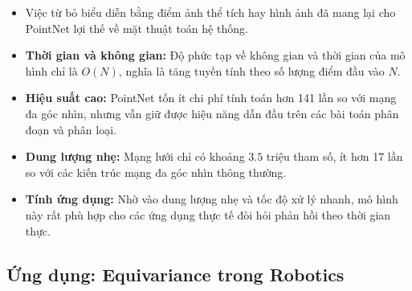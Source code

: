 \begin{itemize}
    \item Việc từ bỏ biểu diễn bằng điểm ảnh thể tích hay hình ảnh đã mang lại cho PointNet lợi thế về mặt thuật toán hệ thống.
    \item \textbf{Thời gian và không gian:} Độ phức tạp về không gian và thời gian của mô hình chỉ là $O(N)$, nghĩa là tăng tuyến tính theo số lượng điểm đầu vào $N$.
    \item \textbf{Hiệu suất cao:} PointNet tốn ít chi phí tính toán hơn 141 lần so với mạng đa góc nhìn, nhưng vẫn giữ được hiệu năng dẫn đầu trên các bài toán phân đoạn và phân loại.
    \item \textbf{Dung lượng nhẹ:} Mạng lưới chỉ có khoảng $3.5$ triệu tham số, ít hơn 17 lần so với các kiến trúc mạng đa góc nhìn thông thường.
    \item \textbf{Tính ứng dụng:} Nhờ vào dung lượng nhẹ và tốc độ xử lý nhanh, mô hình này rất phù hợp cho các ứng dụng thực tế đòi hỏi phản hồi theo thời gian thực.
\end{itemize}



\subsection{Ứng dụng: Equivariance trong Robotics}
\label{subsec:robotics}


